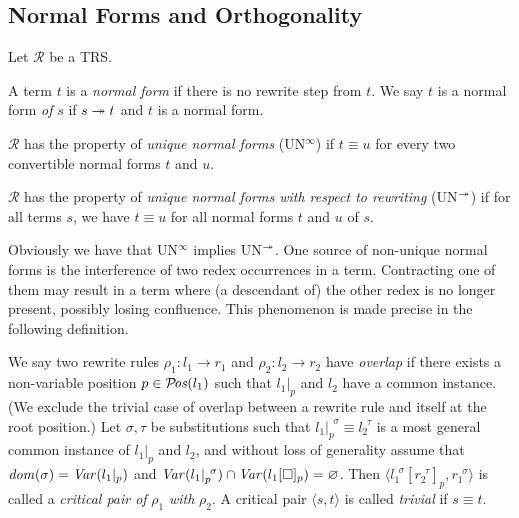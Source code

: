 \subsection{Normal Forms and Orthogonality}

\begin{definition}\label{def:normalisation}%
  Let $\mathcal{R}$ be a TRS.
  \begin{compactenum}
    \item
      A term $t$ is a \emph{normal form} if there is no rewrite step
      from $t$.
      We say $t$ is a normal
      form \emph{of} $s$ if $s \twoheadrightarrow t$ and $t$ is a normal form.
    \item
      $\mathcal{R}$ has the property of \emph{unique normal forms}
      (UN$^\infty$) if $t \equiv u$ for every two
      convertible normal forms $t$ and $u$.
    \item
      $\mathcal{R}$ has the property of \emph{unique normal forms
      with respect to rewriting} (UN$^{\twoheadrightarrow}$) if for all
      terms $s$, we have $t \equiv u$ for all normal forms $t$ and
      $u$ of $s$.
  \end{compactenum}
\end{definition}

Obviously we have that UN$^\infty$ implies UN$^{\twoheadrightarrow}$. One source
of non-unique normal forms is the interference of two redex occurrences
in a term. Contracting one of them may result in a term where (a
descendant of) the other redex is no longer present, possibly losing
confluence. This phenomenon is made precise in the following
definition.

\begin{definition}\label{def:overlap}%
We say two rewrite rules $\rho_1 : l_1 \rightarrow r_1$ and $\rho_2 :
l_2 \rightarrow r_2$ have \emph{overlap} if there exists a
non-variable position $p \in \mathcal{P}\!\mathit{os}(l_1)$ such that $l_1 |_p$ and $l_2$
have a common
instance. (We exclude the trivial case of overlap between a rewrite
rule and itself at the root position.)
Let $\sigma, \tau$ be substitutions such that $l_1 |_p ^{\,\;\sigma}
\equiv l_2 ^{\,\;\tau}$ is a most general common instance of $l_1 |_p$
and $l_2$, and without loss of generality assume that $\mathit{dom}(\sigma) =
\mathit{Var}(l_1 |_p)$ and $\mathit{Var}(l_1 |_p ^{\,\;\sigma}) \cap \mathit{Var}(l_1[\Box]_p)
= \varnothing$. Then $\langle l_1 ^{\,\;\sigma}[r_2^{\,\;\tau}]_p,
r_1^{\,\;\sigma} \rangle$ is called a \emph{critical pair of} $\rho_1$
\emph{with} $\rho_2$. A critical pair $\langle s, t \rangle$ is called
\emph{trivial} if $s \equiv t$.
\end{definition}


